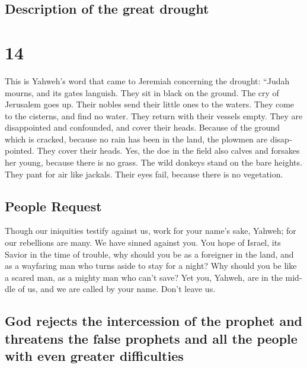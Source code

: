 \begin{paracol}{2}
\switchcolumn
\begin{otherlanguage}{english}

\hypertarget{description-of-the-great-drought}{%
\subsection{Description of the great
drought}\label{description-of-the-great-drought}}

\hypertarget{section-27}{%
\section{14}\label{section-27}}

 This is Yahweh's word that came to Jeremiah concerning
the drought:  ``Judah mourns, and its gates languish. They
sit in black on the ground. The cry of Jerusalem goes up. 
Their nobles send their little ones to the waters. They come to the
cisterns, and find no water. They return with their vessels empty. They
are disappointed and confounded, and cover their heads. 
Because of the ground which is cracked, because no rain has been in the
land, the plowmen are disappointed. They cover their heads.
 Yes, the doe in the field also calves and forsakes her
young, because there is no grass.  The wild donkeys stand
on the bare heights. They pant for air like jackals. Their eyes fail,
because there is no vegetation.

\hypertarget{people-request}{%
\subsection{People Request}\label{people-request}}

 Though our iniquities testify against us, work for your
name's sake, Yahweh; for our rebellions are many. We have sinned against
you.  You hope of Israel, its Savior in the time of
trouble, why should you be as a foreigner in the land, and as a
wayfaring man who turns aside to stay for a night?  Why
should you be like a scared man, as a mighty man who can't save? Yet
you, Yahweh, are in the middle of us, and we are called by your name.
Don't leave us.

\hypertarget{god-rejects-the-intercession-of-the-prophet-and-threatens-the-false-prophets-and-all-the-people-with-even-greater-difficulties}{%
\subsection{God rejects the intercession of the prophet and threatens
the false prophets and all the people with even greater
difficulties}\label{god-rejects-the-intercession-of-the-prophet-and-threatens-the-false-prophets-and-all-the-people-with-even-greater-difficulties}}


\end{otherlanguage}
\end{paracol}
